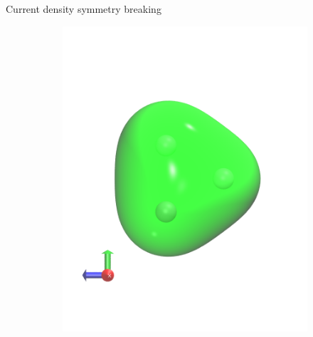 \begin{frame}{Current density symmetry breaking}
\begin{itemize}
{\begin{itemize}
\begin{figure}
            \begin{subfigure}{.40\textwidth}
              \centering
              \includegraphics{./cursym/data/h3/a1_1200ppi.png}
            \end{subfigure}
            \unskip\ \vrule\
            \begin{subfigure}{.40\textwidth}
              \centering

\end{subfigure}
\end{figure}
\end{itemize}}
\end{itemize}
\end{frame}
